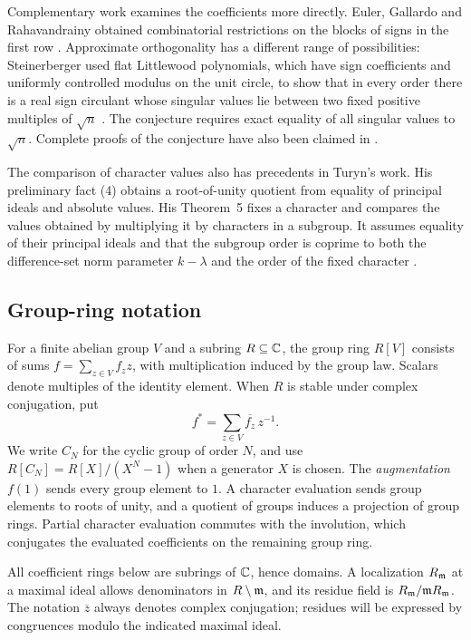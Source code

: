 Complementary work examines the coefficients more directly. Euler,
Gallardo and Rahavandrainy obtained combinatorial restrictions on
the blocks of signs in the first row
\cite{EulerGallardoRahavandrainy2016}. Approximate orthogonality has
a different range of possibilities: Steinerberger used flat Littlewood
polynomials, which have sign coefficients and uniformly controlled
modulus on the unit circle, to show that in every order there is a
real sign circulant whose singular values lie between two fixed positive
multiples of \(\sqrt n\) \cite{Steinerberger2024}. The conjecture
requires exact equality of all singular values to \(\sqrt n\).
Complete proofs of the conjecture have also been claimed in
\cite{OhHashi2016,OrozcoLopez2019,Morris2023,Gallardo2024,ManjhiKumar2025}.

The comparison of character values also has precedents in Turyn's
work. His preliminary fact (4) obtains a root-of-unity quotient from
equality of principal ideals and absolute values. His Theorem~5 fixes
a character and compares the values obtained by multiplying it by
characters in a subgroup. It assumes equality of their principal ideals
and that the subgroup order is coprime to both the difference-set norm parameter \(k-\lambda\)
and the order of the fixed character
\cite[p.~321, item~(4), and Theorem~5, pp.~328--329]{Turyn1965}.

\subsection*{Group-ring notation}

For a finite abelian group \(V\) and a subring \(R\subseteq\mathbb C\), the
group ring \(R[V]\) consists of sums \(f=\sum_{z\in V}f_z z\), with
multiplication induced by the group law. Scalars denote multiples of
the identity element. When \(R\) is stable under complex conjugation,
put
\[
 f^*=\sum_{z\in V}\overline{f_z}\,z^{-1}.
\]
We write \(C_N\) for the cyclic group of order \(N\), and use
\(R[C_N]=R[X]/(X^N-1)\) when a generator \(X\) is chosen.
The \emph{augmentation} \(f(1)\) sends every group element to \(1\).
A character evaluation sends group elements to roots of unity, and a
quotient of groups induces a projection of group rings. Partial
character evaluation commutes with the involution, which conjugates
the evaluated coefficients on the remaining group ring.

All coefficient rings below are subrings of \(\mathbb C\), hence domains.
A localization \(R_{\mathfrak m}\) at a maximal ideal allows denominators in
\(R\setminus\mathfrak m\), and its residue field is
\(R_{\mathfrak m}/\mathfrak m R_{\mathfrak m}\). The notation \(\overline z\) always denotes
complex conjugation; residues will be expressed by congruences modulo
the indicated maximal ideal.

